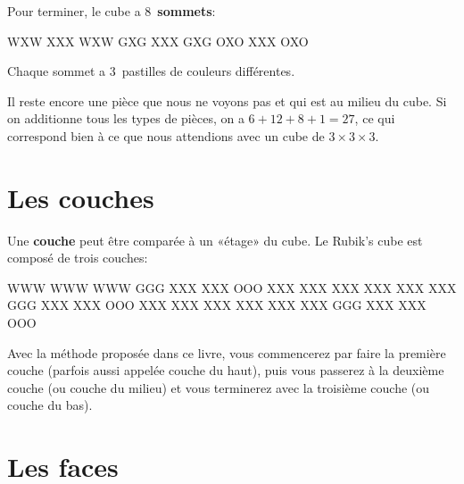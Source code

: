 Pour terminer, le cube a 8~\textbf{sommets}:

\begin{center}
	\RubikFaceUp%
	{W}{X}{W}%
	{X}{X}{X}%
	{W}{X}{W}
	\RubikFaceRight%
	{G}{X}{G}%
	{X}{X}{X}%
	{G}{X}{G}
	\RubikFaceFront%
	{O}{X}{O}%
	{X}{X}{X}%
	{O}{X}{O}
\end{center}

Chaque sommet a 3~pastilles de couleurs différentes.

Il reste encore une pièce que nous ne voyons pas et qui est au milieu du
cube. Si on additionne tous les types de pièces, on a $6 + 12 + 8 + 1 =
27$, ce qui correspond bien à ce que nous attendions avec un cube de $3
\times 3 \times 3$.

\section{Les couches}
\begin{samepage}
Une \textbf{couche} peut être comparée à un «étage» du cube. Le Rubik's cube est composé de trois couches:

\begin{center}
	\RubikFaceUp%
	{W}{W}{W}%
	{W}{W}{W}%
	{W}{W}{W}
	\RubikFaceRight%
	{G}{G}{G}%
	{X}{X}{X}%
	{X}{X}{X}
	\RubikFaceFront%
	{O}{O}{O}%
	{X}{X}{X}%
	{X}{X}{X}
	\hspace*{5mm}
	\RubikFaceUp%
	{X}{X}{X}%
	{X}{X}{X}%
	{X}{X}{X}
	\RubikFaceRight%
	{X}{X}{X}%
	{G}{G}{G}%
	{X}{X}{X}
	\RubikFaceFront%
	{X}{X}{X}%
	{O}{O}{O}%
	{X}{X}{X}
	\hspace*{5mm}
	\RubikFaceUp%
	{X}{X}{X}%
	{X}{X}{X}%
	{X}{X}{X}
	\RubikFaceRight%
	{X}{X}{X}%
	{X}{X}{X}%
	{G}{G}{G}
	\RubikFaceFront%
	{X}{X}{X}%
	{X}{X}{X}%
	{O}{O}{O}
\end{center}
\end{samepage}
	
Avec la méthode proposée dans ce livre, vous commencerez par faire la
première couche (parfois aussi appelée couche du haut), puis vous
passerez à la deuxième couche (ou couche du milieu) et vous terminerez
avec la troisième couche (ou couche du bas).

\section{Les faces}


